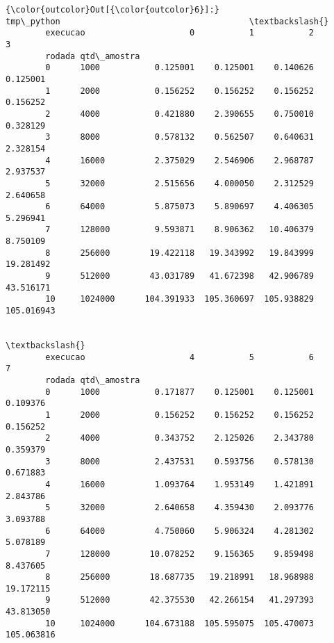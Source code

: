 \documentclass[11pt]{article}
\begin{document}
\begin{Verbatim}[commandchars=\\\{\}]
{\color{outcolor}Out[{\color{outcolor}6}]:}                     tmp\_python                                      \textbackslash{}
        execucao                     0           1           2           3   
        rodada qtd\_amostra                                                   
        0      1000           0.125001    0.125001    0.140626    0.125001   
        1      2000           0.156252    0.156252    0.156252    0.156252   
        2      4000           0.421880    2.390655    0.750010    0.328129   
        3      8000           0.578132    0.562507    0.640631    2.328154   
        4      16000          2.375029    2.546906    2.968787    2.937537   
        5      32000          2.515656    4.000050    2.312529    2.640658   
        6      64000          5.875073    5.890697    4.406305    5.296941   
        7      128000         9.593871    8.906362   10.406379    8.750109   
        8      256000        19.422118   19.343992   19.843999   19.281492   
        9      512000        43.031789   41.672398   42.906789   43.516171   
        10     1024000      104.391933  105.360697  105.938829  105.016943   
        
                                                                            \textbackslash{}
        execucao                     4           5           6           7   
        rodada qtd\_amostra                                                   
        0      1000           0.171877    0.125001    0.125001    0.109376   
        1      2000           0.156252    0.156252    0.156252    0.156252   
        2      4000           0.343752    2.125026    2.343780    0.359379   
        3      8000           2.437531    0.593756    0.578130    0.671883   
        4      16000          1.093764    1.953149    1.421891    2.843786   
        5      32000          2.640658    4.359430    2.093776    3.093788   
        6      64000          4.750060    5.906324    4.281302    5.078189   
        7      128000        10.078252    9.156365    9.859498    8.437605   
        8      256000        18.687735   19.218991   18.968988   19.172115   
        9      512000        42.375530   42.266154   41.297393   43.813050   
        10     1024000      104.673188  105.595075  105.470073  105.063816   
        

\end{Verbatim}
\end{document}
